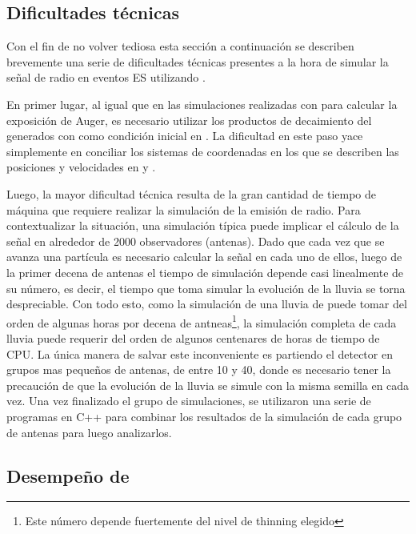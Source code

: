 		
		\subsection{Dificultades técnicas}

		Con el fin de no volver tediosa esta sección a continuaci\'on se describen brevemente una serie de dificultades técnicas presentes a la hora de simular la señal de radio en eventos ES utilizando \zhs{}.

		En primer lugar, al igual que en las simulaciones realizadas con \aires{} para calcular la exposici\'on de Auger, es necesario utilizar los productos de decaimiento del \tauon{} generados con \tauola{} como condici\'on inicial en \zhs{}.
		La dificultad en este paso yace simplemente en conciliar los sistemas de coordenadas en los que se describen las posiciones y velocidades en \tauola{} y \zhs{}.

		Luego, la mayor dificultad técnica resulta de la gran cantidad de tiempo de máquina que requiere realizar la simulación de la emisión de radio.
		Para contextualizar la situación, una simulación típica puede implicar el c\'alculo de la señal en alrededor de 2000 observadores (antenas).
		Dado que cada vez que se avanza una partícula es necesario calcular la señal en cada uno de ellos, luego de la primer decena de antenas el tiempo de simulación depende casi linealmente de su n\'umero, es decir, el tiempo que toma simular la evolución de la lluvia se torna despreciable.
		Con todo esto, como la simulación de una lluvia de  puede tomar del orden de algunas horas por decena de antneas\footnote{Este número depende fuertemente del nivel de thinning elegido}, la simulación completa de cada lluvia puede requerir del orden de algunos centenares de horas de tiempo de CPU.
		La única manera de salvar este inconveniente es partiendo el detector en grupos mas pequeños de antenas, de entre 10 y 40, donde es necesario tener la precaución de que la evolución de la lluvia se simule con la misma semilla en cada vez.
		Una vez finalizado el grupo de simulaciones, se utilizaron una serie de programas en C++ para combinar los resultados de la simulaci\'on de cada grupo de antenas para luego analizarlos.
		
		\subsection{Desempe\~no de \zhs{}}
		
